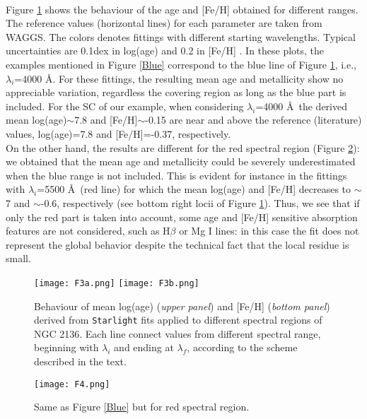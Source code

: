 \documentclass[baaa]{baaa}
\begin{document}
\

Figure \ref{Plots} shows the behaviour of the age and [Fe/H] obtained for different ranges. The reference values (horizontal lines) for each parameter are taken from WAGGS. The colors denotes fittings with different starting wavelengths. Typical uncertainties are 0.1dex in log(age) and 0.2 in [Fe/H] \citep{CR2010b}. In these plots, the examples mentioned in Figure \ref{Blue} correspond to the blue line of Figure \ref{Plots}, i.e., $\lambda_i$=4000 \AA. For these fittings, the resulting mean age and metallicity show no appreciable variation, regardless the covering region as long as the blue part is included. For the SC of our example, when considering $\lambda_i$=4000 \AA\ the derived mean log(age)$\sim$7.8 and [Fe/H]$\sim$-0.15 are near and above the reference (literature) values, log(age)=7.8 and [Fe/H]=-0.37, respectively.
\\

On the other hand, the results are different for the red spectral region (Figure \ref{Red}): we  obtained that the mean age and metallicity could be severely underestimated when the blue range is not included. This is evident for instance in the fittings with $\lambda_i$=5500 \AA\ (red line) for which the mean log(age) and [Fe/H] decreases to $\sim$7 and $\sim$-0.6, respectively (see bottom right locii of Figure \ref{Plots}). Thus, we see that if only the red part is taken into account, some  age and [Fe/H] sensitive absorption features are not considered, such as H$\beta$ or Mg I lines: in this case the fit does not represent the global behavior despite the technical fact that the local residue is small.

\begin{figure}[!ht]
\centering
\texttt{[image: F3a.png]}
\texttt{[image: F3b.png]}
\caption{Behaviour of mean log(age) (\emph {upper panel}) and [Fe/H] (\emph {bottom panel}) derived from {\tt Starlight} fits applied to different spectral regions of NGC 2136. Each line connect values from different spectral range, beginning with $\lambda_{i}$ and ending at $\lambda_f$, according to the scheme described in the text.}
\label{Plots}
\end{figure}

\begin{figure}[!ht]
\centering
\texttt{[image: F4.png]}
\caption{Same as Figure \ref{Blue} but for red spectral region.}
\label{Red}
\end{figure}
\end{document}
